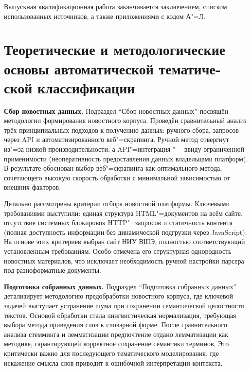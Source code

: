 \documentclass[autoref]{SCWorks}
\begin{document}
Выпускная квалификационная работа заканчивается заключением, списком
использованных источников, а также приложениями с кодом А"=Л.

\section{Теоретические и методологические основы автоматической тематиче-
ской классификации}
\textbf{Сбор новостных данных.}
Подраздел \enquote{Сбор новостных данных} посвящён методологии формирования
новостного корпуса. Проведён сравнительный анализ трёх принципиальных подходов
к получению данных: ручного сбора, запросов через API и автоматизированного
веб"=скрапинга. Ручной метод отвергнут из"=за низкой производительности, а
API"=интеграция "--- ввиду ограниченной применимости (неоперативность
предоставления данных владельцами платформ). В результате обоснован выбор
веб"=скрапинга как оптимального метода, сочетающего высокую скорость обработки
с минимальной зависимостью от внешних факторов.

Детально рассмотрены критерии отбора новостной платформы. Ключевыми требованиями
выступили: единая структура HTML"=документов на всём сайте, отсутствие
системных блокировок HTTP"=запросов и статичность контента (полная доступность
информации без динамической подгрузки через JavaScript). На основе этих
критериев выбран сайт НИУ ВШЭ, полностью соответствующий установленным
требованиям. Особо отмечена его структурная однородность новостных материалов,
что исключает необходимость ручной настройки парсера под разноформатные
документы.

\textbf{Подготовка собранных данных.}
Подраздел \enquote{Подготовка собранных данных} детализирует методологию
предобработки новостного корпуса, где ключевой задачей выступает устранение шума
при сохранении семантической целостности текстов. Основой обработки стала
лингвистическая нормализация, требующая выбора метода приведения слов к
словарной форме. После сравнительного анализа стемминга и лемматизации
предпочтение отдано лемматизации как методике, гарантирующей корректное
сохранение семантики терминов. Это критически важно для последующего
тематического моделирования, где искажение смысла слов приводит к ошибочной
интерпретации контекста.
\end{document}
